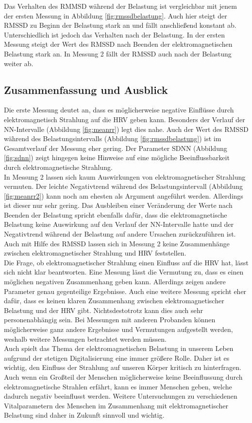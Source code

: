 Das Verhalten des RMMSD während der Belastung ist vergleichbar mit jenem der ersten Messung in Abbildung \ref{fig:rmssdbelastung}. Auch hier steigt der RMSSD zu Beginn der Belastung stark an und fällt anschließend konstant ab. Unterschiedlich ist jedoch das Verhalten nach der Belastung. In der ersten Messung steigt der Wert des RMSSD nach Beenden der elektromagnetischen Belastung stark an. In Messung 2 fällt der RMSSD auch nach der Belastung weiter ab.

\subsection{Zusammenfassung und Ausblick}
Die erste Messung deutet an, dass es möglicherweise negative Einflüsse durch elektromagnetisch Strahlung auf die HRV geben kann. Besonders der Verlauf der NN-Intervalle (Abbildung \ref{fig:meanrr}) legt dies nahe. Auch der Wert des RMSSD während des Belastungsintervalls (Abbildung \ref{fig:rmssdbelastung})  ist im Gesamtverlauf der Messung eher gering. Der Parameter SDNN (Abbildung \ref{fig:sdnn}) zeigt hingegen keine Hinweise auf eine mögliche Beeinflussbarkeit durch elektromagnetische Strahlung. \\
In Messung 2 lassen sich kaum Auswirkungen von elektromagnetischer Strahlung vermuten. Der leichte Negativtrend während des Belastungsintervall (Abbildung \ref{fig:meanrr2}) kann noch am ehesten als Argument angeführt werden. Allerdings ist dieser nur sehr gering. Das Ausbleiben einer Veränderung der Werte nach Beenden der Belastung spricht ebenfalls dafür, dass die elektromagnetische Belastung keine Auswirkung auf den Verlauf der NN-Intervalle hatte und der Negativtrend während der Belastung auf andere Ursachen zurückzuführen ist. Auch mit Hilfe des RMSSD lassen sich in Messung 2 keine Zusammenhänge zwischen elektromagnetischer Strahlung und HRV feststellen.\\

Die Frage, ob elektromagnetischer Strahlung einen Einfluss auf die HRV hat, lässt sich nicht klar beantworten. Eine Messung lässt die Vermutung zu, dass es einen möglichen negativen Zusammenhang geben kann. Allerdings zeigen andere Parameter genau gegenteilige Ergebnisse. Auch eine weitere Messung spricht eher dafür, dass es keinen klaren Zusammenhang zwischen elektromagnetischer Belastung und der HRV gibt. Nichtsdestotrotz kann dies auch sehr personenabhängig sein. Bei Messungen mit anderen Probanden können möglicherweise ganz andere Ergebnisse und Vermutungen aufgestellt werden, weshalb weitere Messungen betrachtet werden müssen. \\
Auch spielt das Thema der elektromagnetischen Belastung in unserem Leben aufgrund der stetigen Digitalisierung eine immer größere Rolle. Daher ist es wichtig, den Einfluss der Strahlung auf unseren Körper kritisch zu hinterfragen. Auch wenn ein Großteil der Menschen möglicherweise keine Beeinflussung durch elektromagnetische Strahlen erfährt, kann es immer Menschen geben, welche dadurch negativ beeinflusst werden. Weitere Untersuchungen zu verschiedenen Vitalparametern des Menschen im Zusammenhang mit elektromagnetischer Belastung sind daher in Zukunft sinnvoll und wichtig.
